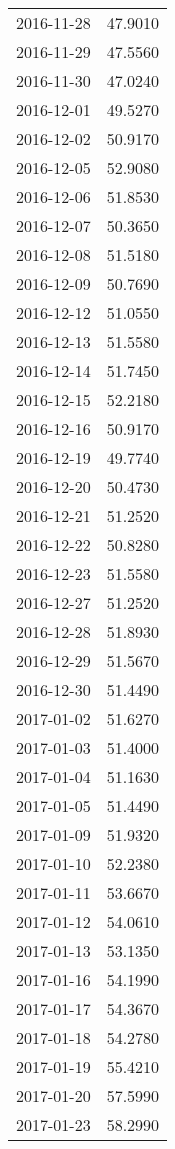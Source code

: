 \begin{tabular}{lr}
2016-11-28 &     47.9010 \\
2016-11-29 &     47.5560 \\
2016-11-30 &     47.0240 \\
2016-12-01 &     49.5270 \\
2016-12-02 &     50.9170 \\
2016-12-05 &     52.9080 \\
2016-12-06 &     51.8530 \\
2016-12-07 &     50.3650 \\
2016-12-08 &     51.5180 \\
2016-12-09 &     50.7690 \\
2016-12-12 &     51.0550 \\
2016-12-13 &     51.5580 \\
2016-12-14 &     51.7450 \\
2016-12-15 &     52.2180 \\
2016-12-16 &     50.9170 \\
2016-12-19 &     49.7740 \\
2016-12-20 &     50.4730 \\
2016-12-21 &     51.2520 \\
2016-12-22 &     50.8280 \\
2016-12-23 &     51.5580 \\
2016-12-27 &     51.2520 \\
2016-12-28 &     51.8930 \\
2016-12-29 &     51.5670 \\
2016-12-30 &     51.4490 \\
2017-01-02 &     51.6270 \\
2017-01-03 &     51.4000 \\
2017-01-04 &     51.1630 \\
2017-01-05 &     51.4490 \\
2017-01-09 &     51.9320 \\
2017-01-10 &     52.2380 \\
2017-01-11 &     53.6670 \\
2017-01-12 &     54.0610 \\
2017-01-13 &     53.1350 \\
2017-01-16 &     54.1990 \\
2017-01-17 &     54.3670 \\
2017-01-18 &     54.2780 \\
2017-01-19 &     55.4210 \\
2017-01-20 &     57.5990 \\
2017-01-23 &     58.2990 \\

\end{tabular}
